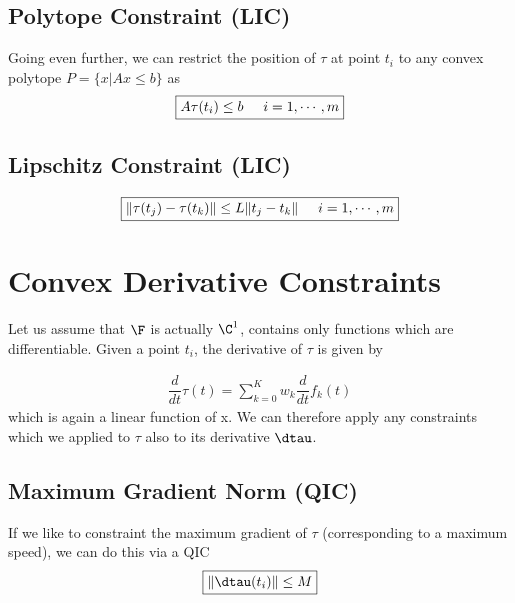 \documentclass{article}
\begin{document}
\subsection{Polytope Constraint (LIC)}
Going even further, we can restrict the position of $\tau$ at point $t_i$ to any
convex polytope $P=\{x| Ax\leq b\}$ as
\begin{equation}
        \begin{aligned}
                \boxed{A\tau(t_i) \leq b \hspace{0.5cm}i=1,\cdots,m}
        \end{aligned}
\end{equation}

\subsection{Lipschitz Constraint (LIC)}
\begin{equation}
        \begin{aligned}
                \boxed{\|\tau(t_j)-\tau(t_k)\| \leq L\|t_j-t_k\| \hspace{0.5cm}i=1,\cdots,m}
        \end{aligned}
\end{equation}

\newpage
\section{Convex Derivative Constraints}

Let us assume that $\F$ is actually $\C^1$, contains only functions which are
differentiable. Given a point $t_i$, the derivative of $\tau$ is given by

\begin{equation}
        \begin{aligned}
                \dfrac{d}{dt}\tau(t) = \sum\limits_{k=0}^K w_k \dfrac{d}{dt} f_k(t)
        \end{aligned}
\end{equation}
which is again a linear function of x. We can therefore apply any constraints
which we applied to $\tau$ also to its derivative $\dtau$.


\subsection{Maximum Gradient Norm (QIC)}
If we like to constraint the maximum gradient of $\tau$ (corresponding to a
maximum speed), we can do this via a QIC
\begin{equation}
        \begin{aligned}
                \boxed{\|\dtau(t_i)\| \leq M}
        \end{aligned}
\end{equation}
\end{document}
